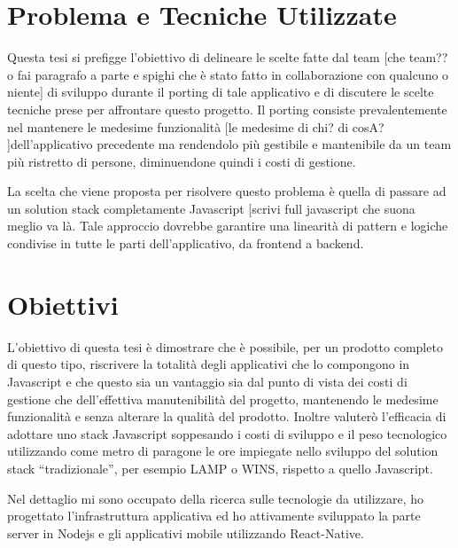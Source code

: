 \section{Problema e Tecniche Utilizzate}\vspace{5mm}

Questa tesi si prefigge l'obiettivo di delineare le scelte fatte dal team [che team?? o fai paragrafo a parte e spighi che è stato fatto in collaborazione con qualcuno o niente] di sviluppo durante il porting di tale applicativo e di discutere le scelte tecniche prese per affrontare questo progetto. Il porting consiste prevalentemente nel mantenere le medesime funzionalità [le medesime di chi? di cosA? ]dell'applicativo precedente ma rendendolo più gestibile e mantenibile da un team più ristretto di persone, diminuendone quindi i costi di gestione.\vspace{5mm}


La scelta che viene proposta per risolvere questo problema è quella di passare ad un solution stack\cite{solutionStack} completamente Javascript [scrivi full javascript che suona meglio va là. Tale approccio dovrebbe garantire una linearità di pattern e logiche condivise in tutte le parti dell'applicativo, da frontend a backend.

\section{Obiettivi}\vspace{5mm}

	L’obiettivo di questa tesi è dimostrare che è possibile, per un prodotto completo di questo tipo, riscrivere la totalità degli applicativi che lo compongono in Javascript e che questo sia un vantaggio sia dal punto di vista dei costi di gestione che dell’effettiva manutenibilità del progetto, mantenendo le medesime funzionalità e senza alterare la qualità del prodotto. Inoltre valuterò l’efficacia di adottare uno stack Javascript soppesando i costi di sviluppo e il peso tecnologico utilizzando come metro di paragone le ore impiegate nello sviluppo del solution stack “tradizionale”, per esempio LAMP\cite{solutionStack} o WINS\cite{solutionStack}, rispetto a quello Javascript.\vspace{5mm}
	
	Nel dettaglio mi sono occupato della ricerca sulle tecnologie da utilizzare, ho progettato l'infrastruttura applicativa ed ho attivamente sviluppato la parte server in Nodejs e gli applicativi mobile utilizzando React-Native\cite{ReactNative}.

